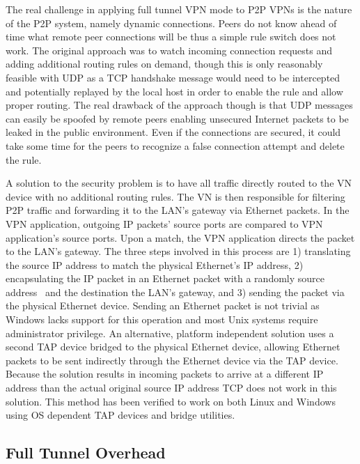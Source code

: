 The real challenge in applying full tunnel VPN mode to P2P VPNs is the nature
of the P2P system, namely dynamic connections.  Peers do not know ahead of time
what remote peer connections will be thus a simple rule switch does not work.
The original approach was to watch incoming connection requests and adding
additional routing rules on demand, though this is only reasonably feasible
with UDP as a TCP handshake message would need to be intercepted and potentially
replayed by the local host in order to enable the rule and allow proper routing.
The real drawback of the approach though is that UDP messages can easily be
spoofed by remote peers enabling unsecured Internet packets to be leaked in the
public environment.  Even if the connections are secured, it could take some
time for the peers to recognize a false connection attempt and delete the rule.

A solution to the security problem is to have all traffic directly routed to
the VN device with no additional routing rules.  The VN is then responsible for
filtering P2P traffic and forwarding it to the LAN's gateway via Ethernet
packets.  In the VPN application, outgoing IP packets' source ports are
compared to VPN application's source ports.  Upon a match, the VPN application
directs the packet to the LAN's gateway.  The three steps involved in this
process are 1) translating the source IP address to match the physical
Ethernet's IP address, 2) encapsulating the IP packet in an Ethernet packet
with a randomly source address~\cite{sc09} and the destination the LAN's
gateway, and 3) sending the packet via the physical Ethernet device.  Sending
an Ethernet packet is not trivial as Windows lacks support for this operation
and most Unix systems require administrator privilege.  An alternative, platform
independent solution uses a second TAP device bridged to the physical Ethernet
device, allowing Ethernet packets to be sent indirectly through the Ethernet
device via the TAP device.  Because the solution results in incoming packets to
arrive at a different IP address than the actual original source IP address TCP
does not work in this solution.  This method has been verified to work on both
Linux and Windows using OS dependent TAP devices and bridge utilities.

\subsection{Full Tunnel Overhead}
\label{full_tunnel_eval}

